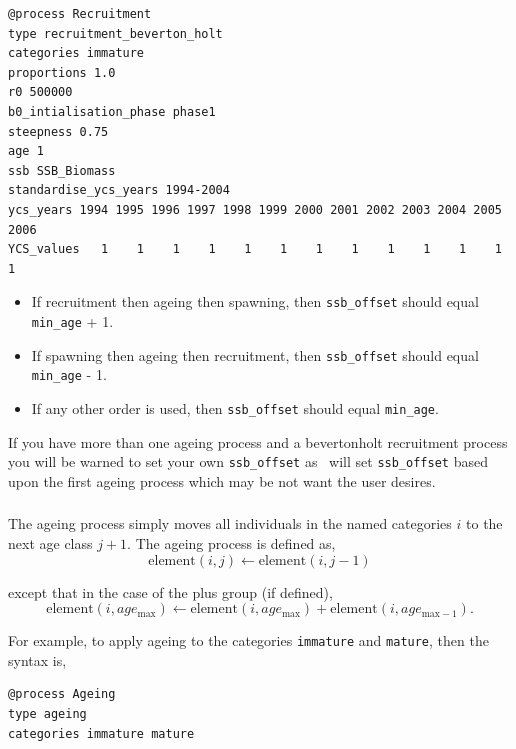 {\small{\begin{verbatim}
@process Recruitment
type recruitment_beverton_holt
categories immature
proportions 1.0
r0 500000
b0_intialisation_phase phase1
steepness 0.75
age 1
ssb SSB_Biomass
standardise_ycs_years 1994-2004
ycs_years 1994 1995 1996 1997 1998 1999 2000 2001 2002 2003 2004 2005 2006
YCS_values   1    1    1    1    1    1    1    1    1    1    1    1    1
\end{verbatim}}}

\begin{itemize}
	\item If recruitment then ageing then spawning, then \texttt{ssb\_offset} should equal \texttt{min\_age} + 1.
	\item If spawning then ageing then recruitment, then \texttt{ssb\_offset} should equal \texttt{min\_age} - 1.
	\item If any other order is used, then \texttt{ssb\_offset} should equal \texttt{min\_age}.
\end{itemize}

If you have more than one ageing process and a bevertonholt recruitment process you will be warned to set your own \texttt{ssb\_offset} as \CNAME\ will set \texttt{ssb\_offset} based upon the first ageing process which may be not want the user desires.


\subsubsection{\label{sec:ageing}}
The ageing process simply moves all individuals in the named categories $i$ to the next age class $j + 1$. The ageing process is defined as,
\begin{equation}
  \text{element}(i,j) \leftarrow \text{element}(i,j-1)
\end{equation}

except that in the case of the plus group (if defined), 
\begin{equation}
  \text{element}(i,age_{\text{max}}) \leftarrow \text{element}(i,age_{\text{max}}) + \text{element}(i,age_{\text{max}-1}).
\end{equation}

For example, to apply ageing to the categories \texttt{immature} and \texttt{mature}, then the syntax is,

{\small{\begin{verbatim}
@process Ageing
type ageing
categories immature mature
\end{verbatim}}}

